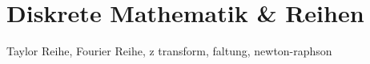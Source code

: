 \chapter{Diskrete Mathematik \& Reihen}

Taylor Reihe, Fourier Reihe, z transform, faltung, newton-raphson